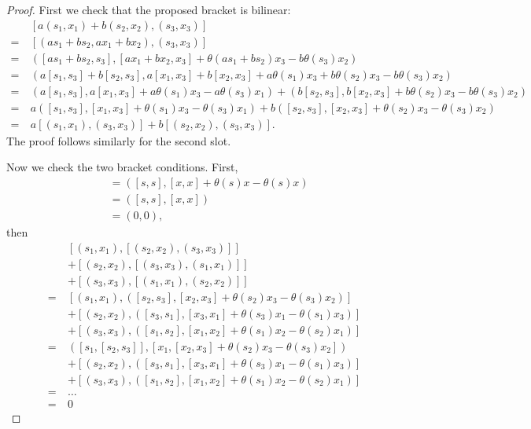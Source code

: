 \documentclass[12pt]{article}
\theoremstyle{definition}
\begin{document}
\begin{proof}
	First we check that the proposed bracket is bilinear: \begin{align*}
		    & [a(s_1, x_1) + b(s_2, x_2), (s_3, x_3)]                                                                                         \\
		=\  & [(as_1 + bs_2, ax_1 + bx_2), (s_3, x_3)]                                                                                        \\
		=\  & ([as_1 + bs_2, s_3], [ax_1 + bx_2, x_3] + \theta(as_1 + bs_2)x_3 - b\theta(s_3)x_2)                                             \\
		=\  & (a[s_1, s_3] + b[s_2, s_3], a[x_1, x_3] + b[x_2, x_3] + a\theta(s_1)x_3 + b\theta(s_2)x_3 - b\theta(s_3)x_2)                    \\
		=\  & (a[s_1, s_3], a[x_1, x_3] + a\theta(s_1)x_3 - a\theta(s_3)x_1) + (b[s_2, s_3], b[x_2, x_3] + b\theta(s_2)x_3 - b\theta(s_3)x_2) \\
		=\  & a([s_1, s_3], [x_1, x_3] + \theta(s_1)x_3 - \theta(s_3)x_1) + b([s_2, s_3], [x_2, x_3] + \theta(s_2)x_3 - \theta(s_3)x_2)       \\
		=\  & a[(s_1, x_1), (s_3, x_3)] + b[(s_2, x_2), (s_3, x_3)].
	\end{align*}
	The proof follows similarly for the second slot.

	Now we check the two bracket conditions.
	First, \begin{align*}
		[(s, x), (s, x)] & = ([s, s], [x, x] + \theta(s)x - \theta(s)x) \\
		                 & = ([s, s], [x, x])                           \\
		                 & = (0, 0),
	\end{align*}
	then \begin{align*}
		    & [(s_1, x_1), [(s_2, x_2), (s_3, x_3)]]                                     \\
		    & + [(s_2, x_2), [(s_3, x_3), (s_1, x_1)]]                                   \\
		    & + [(s_3, x_3), [(s_1, x_1), (s_2, x_2)]]                                   \\
		=\  & [(s_1, x_1), ([s_2, s_3], [x_2, x_3] + \theta(s_2)x_3 - \theta(s_3)x_2)]   \\
		    & + [(s_2, x_2), ([s_3, s_1], [x_3, x_1] + \theta(s_3)x_1 - \theta(s_1)x_3)] \\
		    & + [(s_3, x_3), ([s_1, s_2], [x_1, x_2] + \theta(s_1)x_2 - \theta(s_2)x_1)] \\
		=\  & ([s_1, [s_2, s_3]], [x_1, [x_2, x_3] + \theta(s_2)x_3 - \theta(s_3)x_2])   \\
		    & + [(s_2, x_2), ([s_3, s_1], [x_3, x_1] + \theta(s_3)x_1 - \theta(s_1)x_3)] \\
		    & + [(s_3, x_3), ([s_1, s_2], [x_1, x_2] + \theta(s_1)x_2 - \theta(s_2)x_1)] \\
		=\  & \dots                                                                      \\
		=\  & 0
	\end{align*}
\end{proof}
\end{document}
